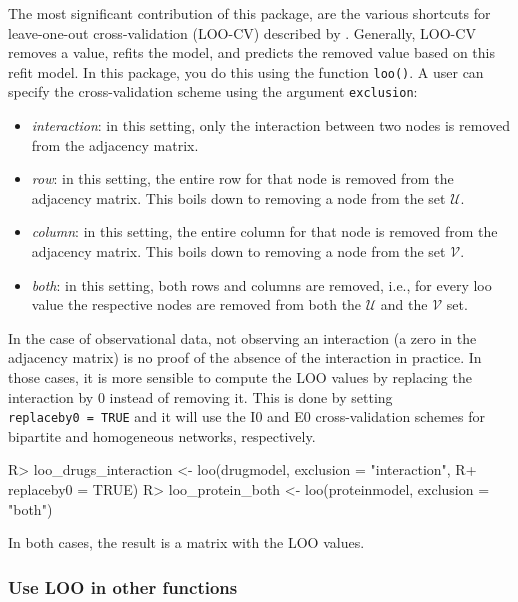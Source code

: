 \documentclass[
]{article}
\providecommand{\tightlist}{%
  \setlength{\itemsep}{0pt}\setlength{\parskip}{0pt}}
\begin{document}
The most significant contribution of this package, are the various
shortcuts for leave-one-out cross-validation (LOO-CV) described by
\citet{Stock2018cvshortcuts}. Generally, LOO-CV removes a value, refits
the model, and predicts the removed value based on this refit model. In
this package, you do this using the function \texttt{loo()}. A user can
specify the cross-validation scheme using the argument
\texttt{exclusion}:

\begin{itemize}
\tightlist
\item
  \emph{interaction}: in this setting, only the interaction between two
  nodes is removed from the adjacency matrix.
\item
  \emph{row}: in this setting, the entire row for that node is removed
  from the adjacency matrix. This boils down to removing a node from the
  set \(\mathcal{U}\).
\item
  \emph{column}: in this setting, the entire column for that node is
  removed from the adjacency matrix. This boils down to removing a node
  from the set \(\mathcal{V}\).
\item
  \emph{both}: in this setting, both rows and columns are removed, i.e.,
  for every loo value the respective nodes are removed from both the
  \(\mathcal{U}\) and the \(\mathcal{V}\) set.
\end{itemize}

In the case of observational data, not observing an interaction (a zero
in the adjacency matrix) is no proof of the absence of the interaction
in practice. In those cases, it is more sensible to compute the LOO
values by replacing the interaction by 0 instead of removing it. This is
done by setting \texttt{replaceby0\ =\ TRUE} and it will use the I0 and
E0 cross-validation schemes for bipartite and homogeneous networks,
respectively.

\begin{CodeChunk}

\begin{CodeInput}
R> loo_drugs_interaction <- loo(drugmodel, exclusion = "interaction",
R+                        replaceby0 = TRUE)
R> loo_protein_both <- loo(proteinmodel, exclusion = "both")
\end{CodeInput}
\end{CodeChunk}

In both cases, the result is a matrix with the LOO values.

\hypertarget{use-loo-in-other-functions}{%
\subsubsection{Use LOO in other
functions}\label{use-loo-in-other-functions}}
\end{document}
